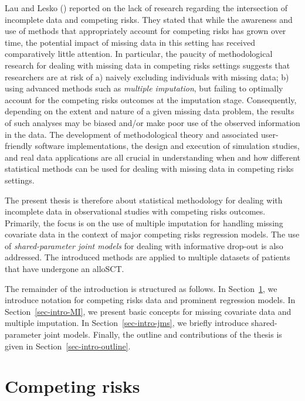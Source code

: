 \documentclass[
  letterpaper,
  DIV=11,
  numbers=noendperiod]{scrreprt}
\begin{document}
Lau and Lesko ()
reported on the lack of research regarding the intersection of
incomplete data and competing risks. They stated that while the
awareness and use of methods that appropriately account for competing
risks has grown over time, the potential impact of missing data in this
setting has received comparatively little attention. In particular, the
paucity of methodological research for dealing with missing data in
competing risks settings suggests that researchers are at risk of a)
naively excluding individuals with missing data; b) using advanced
methods such as \emph{multiple imputation}, but failing to optimally
account for the competing risks outcomes at the imputation stage.
Consequently, depending on the extent and nature of a given missing data
problem, the results of such analyses may be biased and/or make poor use
of the observed information in the data. The development of
methodological theory and associated user-friendly software
implementations, the design and execution of simulation studies, and
real data applications are all crucial in understanding when and how
different statistical methods can be used for dealing with missing data
in competing risks settings.

The present thesis is therefore about statistical methodology for
dealing with incomplete data in observational studies with competing
risks outcomes. Primarily, the focus is on the use of multiple
imputation for handling missing covariate data in the context of major
competing risks regression models. The use of \emph{shared-parameter
joint models} for dealing with informative drop-out is also addressed.
The introduced methods are applied to multiple datasets of patients that
have undergone an alloSCT.

The remainder of the introduction is structured as follows. In
Section~\ref{sec-intro-comp-risks}, we introduce notation for competing
risks data and prominent regression models. In
Section~\ref{sec-intro-MI}, we present basic concepts for missing
covariate data and multiple imputation. In Section~\ref{sec-intro-jms},
we briefly introduce shared-parameter joint models. Finally, the outline
and contributions of the thesis is given in
Section~\ref{sec-intro-outline}.

\section{Competing risks}\label{sec-intro-comp-risks}
\end{document}
